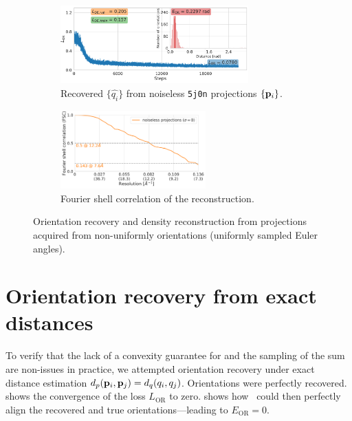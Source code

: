 \begin{figure}[ht!]
    \centering
    \begin{subfigure}[b]{0.60\linewidth}
        \centering
        \includegraphics[height=3cm]{figures/5j0n_ar_aa_fullcvg.pdf}
        \caption{Recovered $\{ \widehat{q_i} \}$ from noiseless \texttt{5j0n} projections $\{ \mathbf{p}_i \}$.}
    \end{subfigure}
    \hfill
    \begin{subfigure}[b]{0.38\linewidth}
        \centering
        \includegraphics[height=3cm]{figures/5j0n_fullcvg_noise0_FSC_apr_init_customFSC.pdf}
        \caption{Fourier shell correlation of the reconstruction.}
    \end{subfigure}
    \caption{%
        Orientation recovery and density reconstruction from projections acquired from non-uniformly orientations (uniformly sampled Euler angles).
    }\label{fig:recovery-nonuniform}
\end{figure}

\section{Orientation recovery from exact distances}\label{apx:results:orientation-recovery:exact}


To verify that the lack of a convexity guarantee for  and the sampling of the sum are non-issues in practice, we attempted orientation recovery under exact distance estimation $d_p(\mathbf{p}_i, \mathbf{p}_j) = d_q(q_i, q_j)$.
Orientations were perfectly recovered.
 shows the convergence of the loss $L_\text{OR}$ to zero.
 shows how~ could then perfectly align the recovered and true orientations---leading to $E_\text{OR} = 0$.

